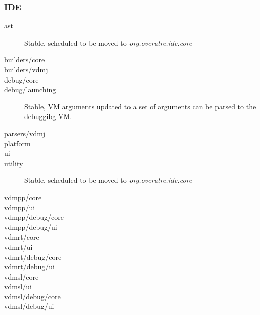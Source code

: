 \subsubsection{IDE}
\begin{description}
\item[ast] Stable, scheduled to be moved to \textit{org.overutre.ide.core}
\item[builders/core]
\item[builders/vdmj]
\item[debug/core]
\item[debug/launching] Stable, VM arguments updated to a set of arguments can be parsed to the debuggibg VM.

\item[parsers/vdmj]
\item[platform]

\item[ui]
\item[utility]Stable, scheduled to be moved to \textit{org.overutre.ide.core}
\item[vdmpp/core]
\item[vdmpp/ui]
\item[vdmpp/debug/core]
\item[vdmpp/debug/ui]

\item[vdmrt/core]
\item[vdmrt/ui]
\item[vdmrt/debug/core]
\item[vdmrt/debug/ui]

\item[vdmsl/core]
\item[vdmsl/ui]
\item[vdmsl/debug/core]
\item[vdmsl/debug/ui]

\end{description}

